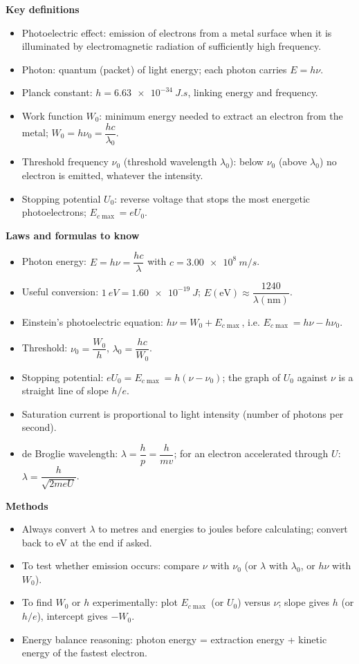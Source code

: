 \documentclass[11pt]{article}
\newcommand{\cle}[1]{{\popxbold\color{popdark}#1}}
\begin{document}
\begin{bilan}
\textbf{Key definitions}
\begin{itemize}
  \item \cle{Photoelectric effect}: emission of electrons from a metal surface when it is illuminated by electromagnetic radiation of sufficiently high frequency.
  \item \cle{Photon}: quantum (packet) of light energy; each photon carries $E=h\nu$.
  \item \cle{Planck constant}: $h=\SI{6.63e-34}{J.s}$, linking energy and frequency.
  \item \cle{Work function} $W_0$: minimum energy needed to extract an electron from the metal; $W_0=h\nu_0=\dfrac{hc}{\lambda_0}$.
  \item \cle{Threshold frequency} $\nu_0$ (threshold wavelength $\lambda_0$): below $\nu_0$ (above $\lambda_0$) no electron is emitted, whatever the intensity.
  \item \cle{Stopping potential} $U_0$: reverse voltage that stops the most energetic photoelectrons; $E_{c\max}=eU_0$.
\end{itemize}

\textbf{Laws and formulas to know}
\begin{itemize}
  \item Photon energy: $E=h\nu=\dfrac{hc}{\lambda}$ with $c=\SI{3.00e8}{m/s}$.
  \item Useful conversion: $\SI{1}{eV}=\SI{1.60e-19}{J}$; $E(\mathrm{eV})\approx \dfrac{1240}{\lambda(\mathrm{nm})}$.
  \item \cle{Einstein's photoelectric equation}: $h\nu = W_0 + E_{c\max}$, i.e. $E_{c\max}=h\nu-h\nu_0$.
  \item Threshold: $\nu_0=\dfrac{W_0}{h}$, $\lambda_0=\dfrac{hc}{W_0}$.
  \item Stopping potential: $eU_0=E_{c\max}=h(\nu-\nu_0)$; the graph of $U_0$ against $\nu$ is a straight line of slope $h/e$.
  \item Saturation current is proportional to light intensity (number of photons per second).
  \item de Broglie wavelength: $\lambda=\dfrac{h}{p}=\dfrac{h}{mv}$; for an electron accelerated through $U$: $\lambda=\dfrac{h}{\sqrt{2meU}}$.
\end{itemize}

\textbf{Methods}
\begin{itemize}
  \item Always convert $\lambda$ to metres and energies to joules before calculating; convert back to eV at the end if asked.
  \item To test whether emission occurs: compare $\nu$ with $\nu_0$ (or $\lambda$ with $\lambda_0$, or $h\nu$ with $W_0$).
  \item To find $W_0$ or $h$ experimentally: plot $E_{c\max}$ (or $U_0$) versus $\nu$; slope gives $h$ (or $h/e$), intercept gives $-W_0$.
  \item Energy balance reasoning: photon energy = extraction energy + kinetic energy of the fastest electron.
\end{itemize}


\end{bilan}
\end{document}
